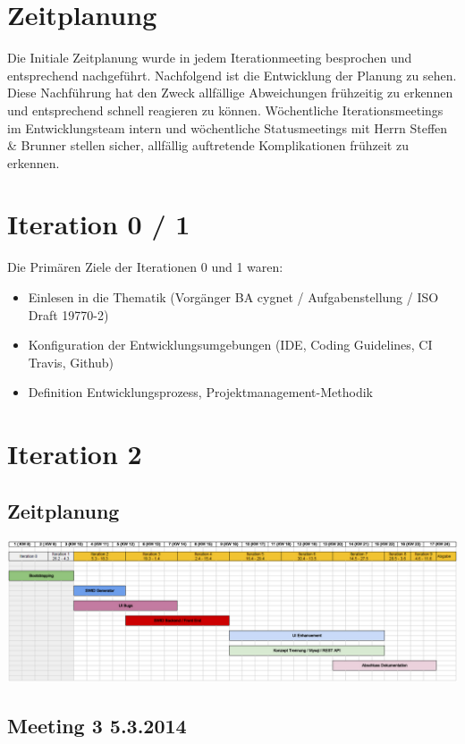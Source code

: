 \section{Zeitplanung}
Die Initiale Zeitplanung wurde in jedem Iterationmeeting besprochen und entsprechend nachgeführt. Nachfolgend ist die Entwicklung der Planung zu sehen. Diese Nachführung hat den Zweck allfällige Abweichungen frühzeitig zu erkennen und entsprechend schnell reagieren zu können. Wöchentliche Iterationsmeetings im Entwicklungsteam intern und wöchentliche Statusmeetings mit Herrn Steffen \& Brunner stellen sicher, allfällig auftretende Komplikationen frühzeit zu erkennen.


\section{Iteration 0 / 1}
Die Primären Ziele der Iterationen 0 und 1 waren:
\begin{itemize}
\item Einlesen in die Thematik (Vorgänger BA cygnet / Aufgabenstellung / ISO Draft 19770-2)
\item Konfiguration der Entwicklungsumgebungen (IDE, Coding Guidelines, CI Travis, Github)
\item Definition Entwicklungsprozess, Projektmanagement-Methodik
\end{itemize}

\section{Iteration 2}
\subsection{Zeitplanung}
\includegraphics[scale=0.3]{images/zeitplanung/Iteration1_2.jpg}
\subsection{Meeting 3 5.3.2014}
